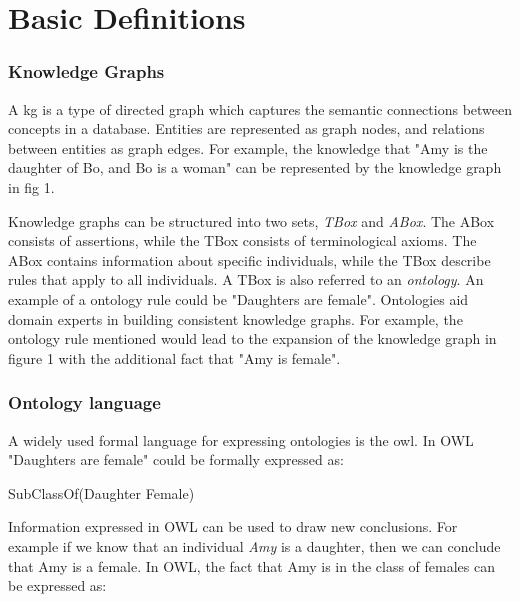 \chapter{Basic Definitions}


\subsection{Knowledge Graphs}
A \gls{kg} is a type of directed graph which captures the semantic connections between concepts in a database. Entities are represented as graph nodes, and relations between entities as graph edges. For example, the knowledge that "Amy is the daughter of Bo, and Bo is a woman" can be represented by the knowledge graph in fig 1.


 Knowledge graphs can be structured into two sets, \emph{TBox} and \emph{ABox}. The ABox consists of assertions, while the TBox consists of terminological axioms. The ABox contains information about specific individuals, while the TBox describe rules that apply to all individuals. A TBox is also referred to an \emph{ontology}. An example of a ontology rule could be "Daughters are female". Ontologies aid domain experts in building consistent knowledge graphs. For example, the ontology rule mentioned would lead to the expansion of the knowledge graph in figure 1 with the additional fact that "Amy is female".

\subsection{Ontology language}
A widely used formal language for expressing ontologies is the \gls{owl}. In OWL "Daughters are female" could be formally expressed as:

\centerline{\textsf{SubClassOf(Daughter Female)}}
Information expressed in OWL can be used to draw new conclusions. For example if we know that an individual \emph{Amy} is a daughter, then we can conclude that Amy is a female. In OWL, the fact that Amy is in the class of females can be expressed as:

